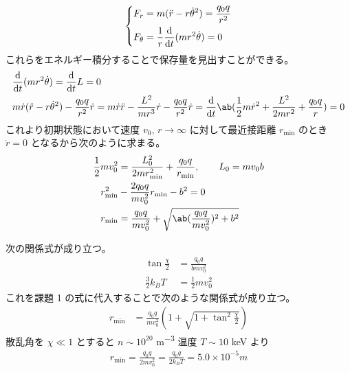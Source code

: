\documentclass[a4paper,11pt]{jlreq}
\begin{document}
\begin{align}
  \begin{dcases}
    F_r = m(\ddot{r} - r\dot{\theta}^2) = \frac{q_0q}{r^2} \\
    F_\theta = \frac{1}{r}\diff{}{t}(mr^2\dot{\theta}) = 0
  \end{dcases}
\end{align}
これらをエネルギー積分することで保存量を見出すことができる。
\begin{align}
   & \diff{}{t}(mr^2\dot\theta) = \diff{}{t}L = 0                                                                                                                                                                          \\
   & m\dot{r}(\ddot{r} - r\dot{\theta}^2) - \frac{q_0q}{r^2}\dot{r} = m\dot{r}\ddot{r} - \frac{L^2}{mr^3}\dot{r} - \frac{q_0q}{r^2}\dot{r} = \diff{}{t}\ab(\frac{1}{2}m\dot{r}^2 + \frac{L^2}{2mr^2} + \frac{q_0q}{r}) = 0
\end{align}
これより初期状態において速度 $v_0$, $r\to\infty$ に対して最近接距離 $r_{\min}$ のとき $\dot{r} = 0$ となるから次のように求まる。
\begin{align}
  \frac{1}{2}mv_0^2 & = \frac{L_0^2}{2mr_{\min}^2} + \frac{q_0q}{r_{\min}}, \qquad L_0 = mv_0b \\
  r_{\min}^2        & - \frac{2q_0q}{mv_0^2}r_{\min} - b^2 = 0                                 \\
  r_{\min}          & = \frac{q_0q}{mv_0^2} + \sqrt{\ab(\frac{q_0q}{mv_0^2})^2 + b^2}
\end{align}

次の関係式が成り立つ。
\begin{align}
  \tan\frac{\chi}{2} & = \frac{q_0q}{bmv_0^2} \\
  \frac{3}{2}k_BT    & = \frac{1}{2}mv_0^2
\end{align}
これを課題 1 の式に代入することで次のような関係式が成り立つ。
\begin{align}
  r_{\min} & = \frac{q_0q}{mv_0^2}(1 + \sqrt{1 + \tan^2\frac{\chi}{2}})
\end{align}
散乱角を $\chi\ll 1$ とすると $n \sim 10^{20}$ \si{m^{-3}} 温度 $T\sim 10$ \si{keV} より
\begin{align}
  r_{\min} = \frac{q_0q}{2mv_0^2} = \frac{q_0q}{2k_BT} = 5.0\times 10^{-5}\si{m}
\end{align}
\end{document}

